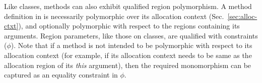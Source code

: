 


Like classes, methods can also exhibit qualified region polymorphism.
A method definition in \FB is necessarily polymorphic over its
allocation context (Sec.~\ref{sec:alloc-ctxt}), and optionally
polymorphic with respect to the regions containing its arguments.
Region parameters, like those on classes, are qualified with
constraints ($\phi$).
Note that if a method is not intended to be polymorphic with respect
to its allocation context (for example, if its allocation context
needs to be same as the allocation region of its \emph{this}
argument), then the required monomorphism can be captured as an
equality constraint in $\phi$.  

